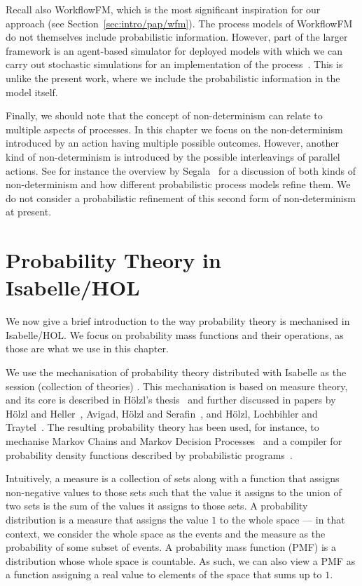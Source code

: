 \documentclass[class=smolathesis,crop=false]{standalone}
\begin{document}
Recall also WorkflowFM, which is the most significant inspiration for our approach (see Section~\ref{sec:intro/pap/wfm}).
The process models of WorkflowFM do not themselves include probabilistic information.
However, part of the larger framework is an agent-based simulator for deployed models with which we can carry out stochastic simulations for an implementation of the process~\cite{papapa_et_al-2021}.
This is unlike the present work, where we include the probabilistic information in the model itself.

Finally, we should note that the concept of non-determinism can relate to multiple aspects of processes.
In this chapter we focus on the non-determinism introduced by an action having multiple possible outcomes.
However, another kind of non-determinism is introduced by the possible interleavings of parallel actions.
See for instance the overview by Segala~\cite{segala-2006} for a discussion of both kinds of non-determinism and how different probabilistic process models refine them.
We do not consider a probabilistic refinement of this second form of non-determinism at present.

\section{Probability Theory in Isabelle/HOL}
\label{sec:prob/bg}

We now give a brief introduction to the way probability theory is mechanised in Isabelle/HOL.
We focus on probability mass functions and their operations, as those are what we use in this chapter.

We use the mechanisation of probability theory distributed with Isabelle as the session (collection of theories) .
This mechanisation is based on measure theory, and its core is described in H{\"o}lzl's thesis~\cite{holzl-2013} and further discussed in papers by H{\"o}lzl and Heller~\cite{holzl_heller-2011}, Avigad, H{\"o}lzl and Serafin~\cite{avigad_holzl_serafin-2017}, and H{\"o}lzl, Lochbihler and Traytel~\cite{holzl_lochbihler_traytel-2015}.
The resulting probability theory has been used, for instance, to mechanise Markov Chains and Markov Decision Processes~\cite{holzl-2017} and a compiler for probability density functions described by probabilistic programs~\cite{eberl_holzl_nipkow-2015}.

Intuitively, a measure is a collection of sets along with a function that assigns non-negative values to those sets such that the value it assigns to the union of two sets is the sum of the values it assigns to those sets.
A probability distribution is a measure that assigns the value $1$ to the whole space --- in that context, we consider the whole space as the events and the measure as the probability of some subset of events.
A probability mass function (PMF) is a distribution whose whole space is countable.
As such, we can also view a PMF as a function assigning a real value to elements of the space that sums up to $1$.
\end{document}
